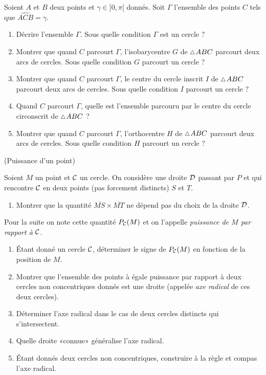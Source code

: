 \documentclass[a4paper,11pt,reqno]{amsart}
\begin{document}
\begin{exo}

  Soient $A$ et $B$ deux points  et $\gamma \in ]0,\pi[$ donnés. Soit $\Gamma$ l'ensemble des points $C$ tels que $\widehat{ACB}=\gamma$.
  \begin{enumerate}
    \item Décrire l'ensemble $\Gamma$. Sous quelle condition $\Gamma$ est un cercle ?
    \item Montrer que quand $C$ parcourt $\Gamma$, l'isobarycentre $G$ de $\tri ABC$ parcourt deux arcs de cercles. Sous quelle condition $G$ parcourt un cercle ?
    \item Montrer que quand $C$ parcourt $\Gamma$, le centre du cercle inscrit $I$ de $\tri ABC$ parcourt deux arcs de cercles. Sous quelle condition $I$ parcourt un cercle ?
    \item Quand $C$ parcourt $\Gamma$, quelle est l'ensemble parcouru par le centre du cercle circonscrit de $\tri ABC$ ?
    \item Montrer que quand $C$ parcourt $\Gamma$, l'orthocentre $H$ de $\tri ABC$ parcourt deux arcs de cercles. Sous quelle condition $H$ parcourt un cercle ?
  \end{enumerate}
\end{exo}

\begin{exo} (Puissance d'un point)

  Soient $M$ un point et $\mathcal{C}$ un cercle. On considère une droite $\mathcal{D}$ passant par $P$ et qui rencontre $\mathcal{C}$ en deux points (pas forcement distincts) $S$ et $T$.
  \begin{enumerate}
    \item Montrer que la quantité $\overline{MS}\times \overline{MT}$ ne dépend pas du choix de la droite $\mathcal{D}$.
  \end{enumerate}
  \begin{convention}
    Pour la suite on note cette quantité $P_{\mathcal{C}}(M)$ et on l'appelle \emph{puissance de $M$ par rapport à $\mathcal{C}$}.
  \end{convention}
  \begin{enumerate}[resume]
    \item Étant donné un cercle $\mathcal{C}$, déterminer le signe de $P_{\mathcal{C}}(M)$ en fonction de la position de $M$.
    \item Montrer que l'ensemble des points à égale puissance par rapport à deux cercles non concentriques donnés est une droite (appelée \emph{axe radical} de ces deux cercles).
    \item Déterminer l'axe radical dans le cas de deux cercles distincts qui s'intersectent.
    \item Quelle droite «connue» généralise l'axe radical.
    \item Étant donnés deux cercles non concentriques, construire à la règle et compas l'axe radical.
  \end{enumerate}
\end{exo}
\end{document}
